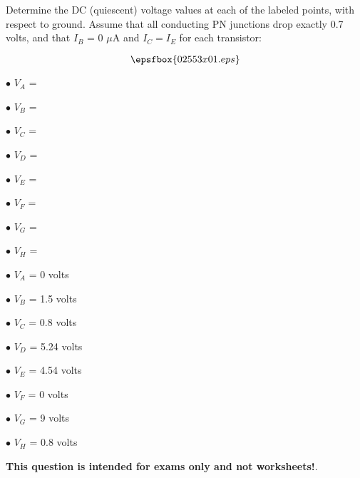

Determine the DC (quiescent) voltage values at each of the labeled points, with respect to ground.  Assume that all conducting PN junctions drop exactly 0.7 volts, and that $I_B$ = 0 $\mu$A and $I_C = I_E$ for each transistor:

$$\epsfbox{02553x01.eps}$$

\medskip
\item{$\bullet$} $V_A$ = 
\item{$\bullet$} $V_B$ = 
\item{$\bullet$} $V_C$ = 
\item{$\bullet$} $V_D$ = 
\item{$\bullet$} $V_E$ = 
\item{$\bullet$} $V_F$ = 
\item{$\bullet$} $V_G$ = 
\item{$\bullet$} $V_H$ = 
\medskip







\medskip
\item{$\bullet$} $V_A$ = 0 volts
\item{$\bullet$} $V_B$ = 1.5 volts
\item{$\bullet$} $V_C$ = 0.8 volts
\item{$\bullet$} $V_D$ = 5.24 volts
\item{$\bullet$} $V_E$ = 4.54 volts
\item{$\bullet$} $V_F$ = 0 volts
\item{$\bullet$} $V_G$ = 9 volts
\item{$\bullet$} $V_H$ = 0.8 volts
\medskip







{\bf This question is intended for exams only and not worksheets!}.




